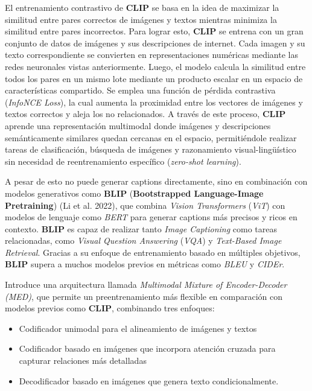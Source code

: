 \documentclass[14pt]{extarticle}
\begin{document}
El entrenamiento contrastivo de \textbf{CLIP} se basa en la idea de maximizar la similitud entre pares correctos de imágenes y textos mientras minimiza la similitud entre pares incorrectos. Para lograr esto, \textbf{CLIP} se entrena con un gran conjunto de datos de imágenes y sus descripciones de internet. Cada imagen y su texto correspondiente se convierten en representaciones numéricas mediante las redes neuronales vistas anteriormente. Luego, el modelo calcula la similitud entre todos los pares en un mismo lote mediante un producto escalar en un espacio de características compartido. Se emplea una función de pérdida contrastiva (\textit{InfoNCE Loss}), la cual aumenta la proximidad entre los vectores de imágenes y textos correctos y aleja los no relacionados. A través de este proceso, \textbf{CLIP} aprende una representación multimodal donde imágenes y descripciones semánticamente similares quedan cercanas en el espacio, permitiéndole realizar tareas de clasificación, búsqueda de imágenes y razonamiento visual-lingüístico sin necesidad de reentrenamiento específico (\textit{zero-shot learning}).

A pesar de esto no puede generar captions directamente, sino en combinación con modelos generativos como \textbf{BLIP} (\textbf{Bootstrapped Language-Image Pretraining}) (Li et al. 2022), que combina \textit{Vision Transformers} (\textit{ViT}) con modelos de lenguaje como \textit{BERT} para generar captions más precisos y ricos en contexto. \textbf{BLIP} es capaz de realizar tanto \textit{Image Captioning} como tareas relacionadas, como \textit{Visual Question Answering} (\textit{VQA}) y \textit{Text-Based Image Retrieval}. Gracias a su enfoque de entrenamiento basado en múltiples objetivos, \textbf{BLIP} supera a muchos modelos previos en métricas como \textit{BLEU} y \textit{CIDEr}.

Introduce una arquitectura llamada \textit{Multimodal Mixture of Encoder-Decoder (MED)}, que permite un preentrenamiento más flexible en comparación con modelos previos como \textbf{CLIP}, combinando tres enfoques:
\begin{itemize}
    \item Codificador unimodal para el alineamiento de imágenes y textos
    \item Codificador basado en imágenes que incorpora atención cruzada para capturar relaciones más detalladas
    \item Decodificador basado en imágenes que genera texto condicionalmente.
\end{itemize}
\end{document}
